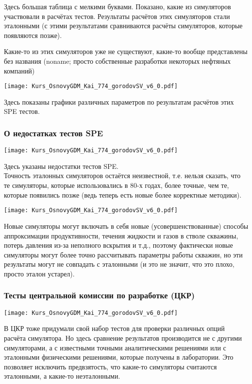 \documentclass[main.tex]{subfiles}
\begin{document}
Здесь большая таблица с мелкими буквами.
Показано, какие из симуляторов участвовали в расчётах тестов.
Результаты расчётов этих симуляторов стали эталонными (с этими результатами сравниваются расчёты симуляторов, которые появляются позже).

Какие-то из этих симуляторов уже не существуют, какие-то вообще представлены без названия (noname; просто собственные разработки некоторых нефтяных компаний)

\texttt{[image: Kurs\_OsnovyGDM\_Kai\_774\_gorodovSV\_v6\_0.pdf]}

Здесь показаны графики различных параметров по результатам расчётов этих SPE тестов.

\subsubsection{О недостатках тестов SPE}

\texttt{[image: Kurs\_OsnovyGDM\_Kai\_774\_gorodovSV\_v6\_0.pdf]}

Здесь указаны недостатки тестов SPE.
\\

Точность эталонных симуляторов остаётся неизвестной, т.е. нельзя сказать, что те симуляторы, которые использовались в 80-х годах, более точные, чем те, которые появились позже (ведь теперь есть новые более корректные методики).

\texttt{[image: Kurs\_OsnovyGDM\_Kai\_774\_gorodovSV\_v6\_0.pdf]}

Новые симуляторы могут включать в себя новые (усовершенствованные) способы аппроксимации продуктивности, течения жидкости и газов в стволе скважины, потерь давления из-за неполного вскрытия и т.д., поэтому фактически новые симуляторы могут более точно рассчитывать параметры работы скважин, но эти результаты могут не совпадать с эталонными (и это не значит, что это плохо, просто эталон устарел).

\subsubsection{Тесты центральной комиссии по разработке (ЦКР)}

\texttt{[image: Kurs\_OsnovyGDM\_Kai\_774\_gorodovSV\_v6\_0.pdf]}

В ЦКР тоже придумали свой набор тестов для проверки различных опций расчёта симулятора.
Но здесь сравнение результатов производится не с другими симуляторами, а с известными точными аналитическими решениями или с эталонными физическими решениями, которые получены в лаборатории.
Это позволяет исключить предвзятость, что какие-то симуляторы считаются эталонными, а какие-то неэталонными.
\end{document}
